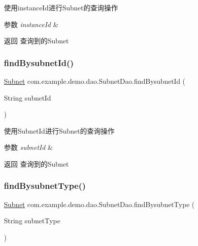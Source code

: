 使用instance\+Id进行\+Subnet的查询操作 
\begin{DoxyParams}{参数}
{\em instance\+Id} & \\
\hline
\end{DoxyParams}
\begin{DoxyReturn}{返回}
查询到的\+Subnet 
\end{DoxyReturn}
\mbox{\label{interfacecom_1_1example_1_1demo_1_1dao_1_1_subnet_dao_ab29a06feb2d1b1f190597d5e2b796baa}} 
\subsubsection{\texorpdfstring{find\+Bysubnet\+Id()}{findBysubnetId()}}
{\footnotesize\ttfamily \mbox{\hyperlink{classcom_1_1example_1_1demo_1_1modular_1_1_subnet}{Subnet}} com.\+example.\+demo.\+dao.\+Subnet\+Dao.\+find\+Bysubnet\+Id (\begin{DoxyParamCaption}\item[{String}]{subnet\+Id }\end{DoxyParamCaption})}

使用\+Subnet\+Id进行\+Subnet的查询操作 
\begin{DoxyParams}{参数}
{\em subnet\+Id} & \\
\hline
\end{DoxyParams}
\begin{DoxyReturn}{返回}
查询到的\+Subnet 
\end{DoxyReturn}
\mbox{\label{interfacecom_1_1example_1_1demo_1_1dao_1_1_subnet_dao_ac7f65c2b28e4f923de88aafe4d09f36b}} 
\subsubsection{\texorpdfstring{find\+Bysubnet\+Type()}{findBysubnetType()}}
{\footnotesize\ttfamily \mbox{\hyperlink{classcom_1_1example_1_1demo_1_1modular_1_1_subnet}{Subnet}} com.\+example.\+demo.\+dao.\+Subnet\+Dao.\+find\+Bysubnet\+Type (\begin{DoxyParamCaption}\item[{String}]{subnet\+Type }\end{DoxyParamCaption})}

